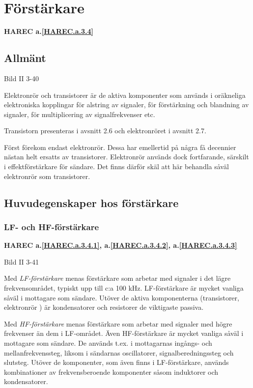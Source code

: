 \section{Förstärkare}
\textbf{HAREC a.\ref{HAREC.a.3.4}\label{myHAREC.a.3.4}}

\subsection{Allmänt}

Bild II 3-40

Elektronrör och transistorer är de aktiva komponenter som används i
oräkneliga elektroniska kopplingar för alstring av signaler, för
förstärkning och blandning av signaler, för multiplicering av
signalfrekvenser etc.

Transistorn presenteras i avsnitt 2.6 och elektronröret i avsnitt 2.7.

Först förekom endast elektronrör. Dessa har emellertid på några få
decennier nästan helt ersatts av transistorer. Elektronrör används
dock fortfarande, särskilt i effektförstärkare för sändare. Det finns
därför skäl att här behandla såväl elektronrör som transistorer.

\subsection{Huvudegenskaper hos förstärkare}
\subsubsection{LF- och HF-förstärkare}
\textbf{HAREC a.\ref{HAREC.a.3.4.1}, a.\ref{HAREC.a.3.4.2}, a.\ref{HAREC.a.3.4.3}\label{myHAREC.a.3.4.1}\label{myHAREC.a.3.4.2}\label{myHAREC.a.3.4.3}}

Bild II 3-41

Med \emph{LF-förstärkare} menas förstärkare som arbetar med signaler i
det lägre frekvensområdet, typiskt upp till c:a 100
kHz. LF-förstärkare är mycket vanliga såväl i mottagare som
sändare. Utöver de aktiva komponenterna (transistorer, elektronrör )
är kondensatorer och resistorer de viktigaste passiva.

Med \emph{HF-förstärkare} menas förstärkare som arbetar med signaler
med högre frekvenser än dem i LF-området. Även HF-förstärkare är
mycket vanliga såväl i mottagare som sändare. De används t.ex. i
mottagarnas ingångs- och mellanfrekvenssteg, liksom i sändarnas
oscillatorer, signalberedningssteg och slutsteg.  Utöver de
komponenter, som även finns i LF-förstärkare, används kombinationer av
frekvensberoende komponenter såsom induktorer och kondensatorer.

